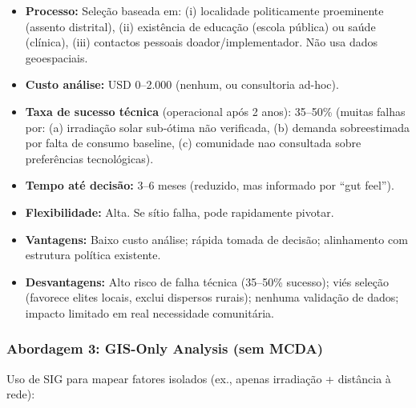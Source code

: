 \documentclass[12pt, a4paper]{article}
\begin{document}
\begin{itemize}
\item \textbf{Processo:} Seleção baseada em: (i) localidade politicamente proeminente (assento distrital), (ii) existência de educação (escola pública) ou saúde (clínica), (iii) contactos pessoais doador/implementador. Não usa dados geoespaciais.

\item \textbf{Custo análise:} USD 0--2.000 (nenhum, ou consultoria ad-hoc).

\item \textbf{Taxa de sucesso técnica} (operacional após 2 anos): 35--50\% (muitas falhas por: (a) irradiação solar sub-ótima não verificada, (b) demanda sobreestimada por falta de consumo baseline, (c) comunidade nao consultada sobre preferências tecnológicas).

\item \textbf{Tempo até decisão:} 3--6 meses (reduzido, mas informado por ``gut feel'').

\item \textbf{Flexibilidade:} Alta. Se sítio falha, pode rapidamente pivotar.

\item \textbf{Vantagens:} Baixo custo análise; rápida tomada de decisão; alinhamento com estrutura política existente.

\item \textbf{Desvantagens:} Alto risco de falha técnica (35--50\% sucesso); viés seleção (favorece elites locais, exclui dispersos rurais); nenhuma validação de dados; impacto limitado em real necessidade comunitária.
\end{itemize}

\subsubsection{Abordagem 3: GIS-Only Analysis (sem MCDA)}

Uso de SIG para mapear fatores isolados (ex., apenas irradiação + distância à rede):
\end{document}
